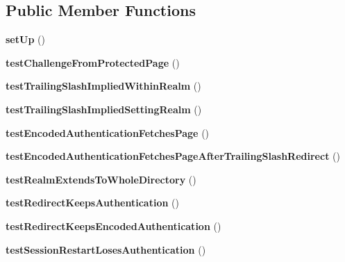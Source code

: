 \subsection*{Public Member Functions}
\begin{DoxyCompactItemize}
\item 
\hypertarget{class_test_of_live_authentication_a5f16e9e84aa05d616e98b341afa6f5fc}{
{\bfseries setUp} ()}
\label{class_test_of_live_authentication_a5f16e9e84aa05d616e98b341afa6f5fc}

\item 
\hypertarget{class_test_of_live_authentication_ad7eeeae98c9aecca65ab9a6dc9071994}{
{\bfseries testChallengeFromProtectedPage} ()}
\label{class_test_of_live_authentication_ad7eeeae98c9aecca65ab9a6dc9071994}

\item 
\hypertarget{class_test_of_live_authentication_a5c200f57c60682300293bc01baa41de8}{
{\bfseries testTrailingSlashImpliedWithinRealm} ()}
\label{class_test_of_live_authentication_a5c200f57c60682300293bc01baa41de8}

\item 
\hypertarget{class_test_of_live_authentication_a43ddb9cb2e548564dbc7f90e763c238f}{
{\bfseries testTrailingSlashImpliedSettingRealm} ()}
\label{class_test_of_live_authentication_a43ddb9cb2e548564dbc7f90e763c238f}

\item 
\hypertarget{class_test_of_live_authentication_a4559c718500fcbe1f701a5c66d5cc98f}{
{\bfseries testEncodedAuthenticationFetchesPage} ()}
\label{class_test_of_live_authentication_a4559c718500fcbe1f701a5c66d5cc98f}

\item 
\hypertarget{class_test_of_live_authentication_ac9cc4e8f85387fa83b8559702aa86b1a}{
{\bfseries testEncodedAuthenticationFetchesPageAfterTrailingSlashRedirect} ()}
\label{class_test_of_live_authentication_ac9cc4e8f85387fa83b8559702aa86b1a}

\item 
\hypertarget{class_test_of_live_authentication_a40540446412e19a8848f9451e107e63c}{
{\bfseries testRealmExtendsToWholeDirectory} ()}
\label{class_test_of_live_authentication_a40540446412e19a8848f9451e107e63c}

\item 
\hypertarget{class_test_of_live_authentication_abef8a5bc601d0ef1c323695f28883bf7}{
{\bfseries testRedirectKeepsAuthentication} ()}
\label{class_test_of_live_authentication_abef8a5bc601d0ef1c323695f28883bf7}

\item 
\hypertarget{class_test_of_live_authentication_a1c95d53c449f6ac296f69a0c3dcdb2ee}{
{\bfseries testRedirectKeepsEncodedAuthentication} ()}
\label{class_test_of_live_authentication_a1c95d53c449f6ac296f69a0c3dcdb2ee}

\item 
\hypertarget{class_test_of_live_authentication_a18c4c625c19998a055cf63e1c5dfb726}{
{\bfseries testSessionRestartLosesAuthentication} ()}
\label{class_test_of_live_authentication_a18c4c625c19998a055cf63e1c5dfb726}

\end{DoxyCompactItemize}



